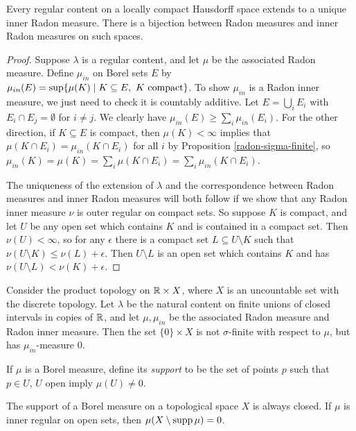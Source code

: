 \begin{cor} Every regular content on a locally compact Hausdorff space extends to a unique inner Radon measure. There is a bijection between Radon measures and inner Radon measures on such spaces.
\end{cor}
\begin{proof} Suppose $\lambda$ is a regular content, and let $\mu$ be the associated Radon measure. Define $\mu_{in}$ on Borel sets $E$ by $\mu_{in}(E) = \sup \{\mu(K) \mid K \subseteq E,\ K\text{ \rm compact}\}$. To show $\mu_{in}$ is a Radon inner measure, we just need to check it is countably additive. Let $E = \bigcup_i E_i$ with $E_i \cap E_j = \emptyset$ for $i \ne j$. We clearly have $\mu_{in}(E) \ge \sum_i \mu_{in}(E_i)$. For the other direction, if $K \subseteq E$ is compact, then $\mu(K) < \infty$ implies that $\mu(K \cap E_i) = \mu_{in}(K \cap E_i)$ for all $i$ by Proposition \ref{radon-sigma-finite}, so $\mu_{in}(K) = \mu(K) = \sum_i \mu(K \cap E_i) = \sum_i \mu_{in}(K \cap E_i)$.

The uniqueness of the extension of $\lambda$ and the correspondence between Radon measures and inner Radon measures will both follow if we show that any Radon inner measure $\nu$ is outer regular on compact sets. So suppose $K$ is compact, and let $U$ be any open set which contains $K$ and is contained in a compact set. Then $\nu(U) < \infty$, so for any $\epsilon$ there is a compact set $L \subseteq U\setminus K$ such that $\nu(U\setminus K) \le \nu(L)+\epsilon$. Then $U\setminus L$ is an open set which contains $K$ and has $\nu(U\setminus L) < \nu(K) + \epsilon$.
\end{proof}

\begin{ex} Consider the product topology on $\mathbb{R}\times X$, where $X$ is an uncountable set with the discrete topology. Let $\lambda$ be the natural content on finite unions of closed intervals in copies of $\mathbb{R}$, and let $\mu, \mu_{in}$ be the associated Radon measure and Radon inner measure. Then the set $\{0\} \times X$ is not $\sigma$-finite with respect to $\mu$, but has $\mu_{in}$-measure $0$.
\end{ex}

\begin{defn} If $\mu$ is a Borel measure, define its \emph{support} to be the set of points $p$ such that $p \in U$, $U$ open imply $\mu(U) \ne 0$.
\end{defn}

\begin{prop} The support of a Borel measure on a topological space $X$ is always closed. If $\mu$ is inner regular on open sets, then $\mu(X \setminus \operatorname{supp} \mu) = 0$.
\end{prop}

